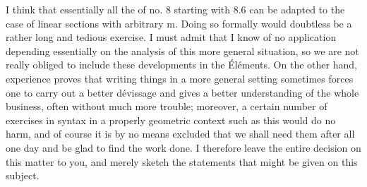 

I think that essentially all the  of no. 8 starting
with 8.6 can  be adapted to the case of linear sections with
arbitrary m. Doing so formally would doubtless be a rather long
and tedious exercise. I must admit that I know of no application
depending essentially on the analysis of this more general
situation, so we are not really obliged to include these
developments in the Éléments. On the other hand, experience proves that
writing things in a more general setting sometimes forces one to
carry out a better dévissage and gives a better understanding of the whole business, often without much
more trouble; moreover, a certain number of exercises in syntax in a
properly geometric context such as this would do no harm, and
of course it is by no means excluded that we shall need them after all
one day and be glad to find the work done. I therefore leave
the entire decision on this matter to you, and merely sketch the
statements that might be given on this subject.

